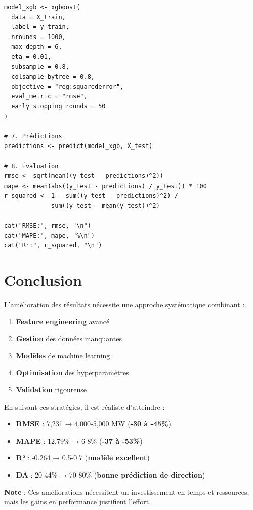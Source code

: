 \documentclass[12pt,a4paper]{article}
\begin{document}
\begin{verbatim}
model_xgb <- xgboost(
  data = X_train,
  label = y_train,
  nrounds = 1000,
  max_depth = 6,
  eta = 0.01,
  subsample = 0.8,
  colsample_bytree = 0.8,
  objective = "reg:squarederror",
  eval_metric = "rmse",
  early_stopping_rounds = 50
)

# 7. Prédictions
predictions <- predict(model_xgb, X_test)

# 8. Évaluation
rmse <- sqrt(mean((y_test - predictions)^2))
mape <- mean(abs((y_test - predictions) / y_test)) * 100
r_squared <- 1 - sum((y_test - predictions)^2) / 
             sum((y_test - mean(y_test))^2)

cat("RMSE:", rmse, "\n")
cat("MAPE:", mape, "%\n")
cat("R²:", r_squared, "\n")
\end{verbatim}

\section{Conclusion}

L'amélioration des résultats nécessite une approche systématique combinant :
\begin{enumerate}
    \item \textbf{Feature engineering} avancé
    \item \textbf{Gestion} des données manquantes
    \item \textbf{Modèles} de machine learning
    \item \textbf{Optimisation} des hyperparamètres
    \item \textbf{Validation} rigoureuse
\end{enumerate}

En suivant ces stratégies, il est réaliste d'atteindre :
\begin{itemize}
    \item \textbf{RMSE} : 7,231 → 4,000-5,000 MW (\textbf{-30 à -45\%})
    \item \textbf{MAPE} : 12.79\% → 6-8\% (\textbf{-37 à -53\%})
    \item \textbf{R²} : -0.264 → 0.5-0.7 (\textbf{modèle excellent})
    \item \textbf{DA} : 20-44\% → 70-80\% (\textbf{bonne prédiction de direction})
\end{itemize}

\vspace{1cm}

\noindent\textbf{Note} : Ces améliorations nécessitent un investissement en temps et ressources, mais les gains en performance justifient l'effort.
\end{document}
